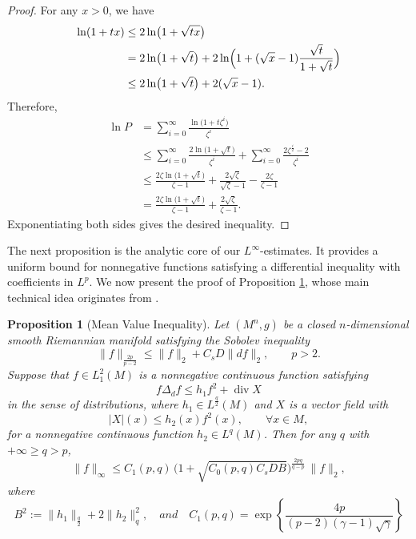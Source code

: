 \documentclass[12pt, twoside]{article}
\newtheorem{proposition}[theorem]{Proposition}
\theoremstyle{definition}
\numberwithin{equation}{section}
\begin{document}
	\begin{proof}
		For any \(x > 0\), we have
		\begin{align*}
		\ln(1+tx) &\le 2\ln\bigl(1+\sqrt{tx}\bigr) \\
		&= 2\ln\bigl(1+\sqrt{t}\bigr) 
		+ 2\ln\Bigl(1+(\sqrt{x}-1)\frac{\sqrt{t}}{1+\sqrt{t}}\Bigr) \\
		&\le 2\ln\bigl(1+\sqrt{t}\bigr) + 2(\sqrt{x}-1).
		\end{align*}
		Therefore,
		\begin{align*}
		\ln P &= \sum_{i=0}^{\infty} \frac{\ln\bigl(1+t\zeta^{i}\bigr)}{\zeta^{i}} \\
		&\le \sum_{i=0}^{\infty} \frac{2\ln\bigl(1+\sqrt{t}\bigr)}{\zeta^{i}}
		+ \sum_{i=0}^{\infty} \frac{2\zeta^{\frac{i}{2}}-2}{\zeta^{i}} \\
		&\le \frac{2\zeta\ln\bigl(1+\sqrt{t}\bigr)}{\zeta-1}
		+ \frac{2\sqrt{\zeta}}{\sqrt{\zeta}-1} - \frac{2\zeta}{\zeta-1} \\
		&= \frac{2\zeta\ln\bigl(1+\sqrt{t}\bigr)}{\zeta-1} + \frac{2\sqrt{\zeta}}{\zeta-1}.
		\end{align*}
		Exponentiating both sides gives the desired inequality.
	\end{proof}
	
	The next proposition is the analytic core of our \(L^\infty\)-estimates. It provides a uniform bound for nonnegative functions satisfying a differential inequality with coefficients in \(L^p\). We now present the proof of Proposition \ref{prop:mean-value},  whose main technical idea originates from \cite{Aubry2009,Aubry2003}.
	
	\begin{proposition}[Mean Value Inequality]\label{prop:mean-value}
		Let \((M^{n},g)\) be a closed \(n\)-dimensional smooth Riemannian manifold satisfying the Sobolev inequality
		\begin{equation}\label{eq:sob-ineq}
		\|f\|_{\frac{2p}{p-2}} \le \|f\|_2 + C_s D \|df\|_2,\qquad p>2.
		\end{equation}
		Suppose that \(f \in L^2_1(M)\) is a nonnegative continuous function satisfying
		\begin{equation}\label{eq:diff-ineq}
		f\Delta_d f \le h_1 f^2 + \operatorname{div} X
		\end{equation}
		in the sense of distributions, where \(h_1 \in L^\frac{q}{2}(M)\) and \(X\) is a vector field with
		\begin{equation}\label{eq:V-bound}
		|X|(x) \le h_2(x) f^2(x), \qquad \forall x \in M,
		\end{equation}
		for a nonnegative continuous function \(h_2 \in L^{q}(M)\). Then for any \(q\) with {\(+\infty\geq q > p\)},
		\begin{equation}\label{eq:Linfty-bound}
		\|f\|_\infty \le C_1(p,q)\,
		\bigl(1 + \sqrt{C_{0}(p,q)C_s D B}\bigr)^{\frac{2pq}{q-p}}\,
		\|f\|_2,
		\end{equation}
		where 
		\[
		B^2 := \|h_1\|_\frac{q}{2} + 2\|h_2\|_{q}^2,\quad and\quad C_{1}(p,q)= \exp\left\{\frac{4p}{(p-2)(\gamma-1)\sqrt{\gamma}}\right\}
		\]
	\end{proposition}
	
\end{document}
